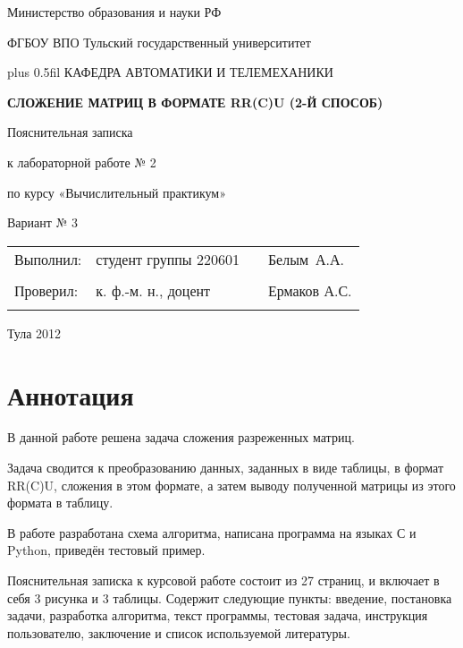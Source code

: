 \documentclass[a4paper,12pt,russian]{article}
\makeatletter
\renewcommand{\normalfont}{\fontsize{14}{20}\fontfamily{ftm}\linespread{1.25}\selectfont}
\renewcommand{\tiny}{\fontsize{12}{14}\fontfamily{ftm}\linespread{1.0}\selectfont}
\renewcommand{\maketitle}[2]{
\begin{titlepage}
\begin{center}\linespread{1}\parskip=0.0cm\normalfont
Министерство образования и науки РФ

ФГБОУ ВПО Тульский государственный университитет

\vskip 0pt plus 0.5fil
КАФЕДРА АВТОМАТИКИ И ТЕЛЕМЕХАНИКИ

\vfill
\textbf{#1}

\vskip 2cm
Пояснительная записка 

к лабораторной работе № #2


по курсу «Вычислительный практикум»

\vfill
Вариант № 3

\vfill
\begin{tabular*}{\textwidth}{ll@{\extracolsep{\fill}}c@{\extracolsep{0pt}}l}
Выполнил: & студент группы 220601&&Белым~А.А.\\ \cline{3-3}
								&&\tiny{(подпись)}& 	\\
Проверил: & к. ф.-м. н., доцент &&Ермаков А.С.\\ \cline{3-3}
								&&\tiny{(подпись)}& 	\\
\end{tabular*}
\vfill
Тула 2012
\end{center}
\end{titlepage}
}
\newcommand{\ssec}[1]{\section{#1}\hspace*{\parindent}}
\makeatother
\begin{document}
\maketitle {СЛОЖЕНИЕ МАТРИЦ В ФОРМАТЕ RR(C)U (2-Й СПОСОБ)}{2}
\ssec{Аннотация}
\normalfont
В данной работе решена задача сложения разреженных матриц.

Задача сводится к преобразованию данных, заданных в виде таблицы, в формат RR(C)U, сложения в этом формате, а затем выводу полученной матрицы из этого формата в таблицу.

В работе разработана схема алгоритма, написана программа на языках С и Python, приведён тестовый пример.

Пояснительная записка к курсовой работе состоит из 27 страниц, и включает в себя 3 рисунка и 3 таблицы. Содержит следующие пункты: введение, постановка задачи, разработка алгоритма, текст программы, тестовая задача, инструкция пользователю, заключение и список используемой литературы.
\end{document}
